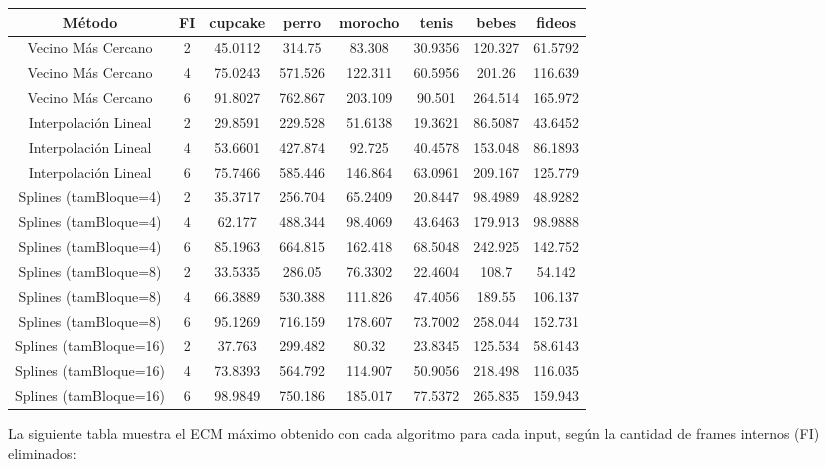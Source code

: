 \bigskip
{}
\begin{tabular}{| c | c | c | c | c | c | c | c |} 
\hline
\textbf{Método} & \textbf{FI} & \textbf{cupcake} & \textbf{perro} & \textbf{morocho} & \textbf{tenis} & \textbf{bebes} & \textbf{fideos} \\ 
\hline
Vecino Más Cercano & 2 & 45.0112 & 314.75 & 83.308 & 30.9356 & 120.327 & 61.5792 \\ 
\hline
Vecino Más Cercano & 4 & 75.0243 & 571.526 & 122.311 & 60.5956 & 201.26 & 116.639 \\ 
\hline
Vecino Más Cercano & 6 & 91.8027 & 762.867 & 203.109 & 90.501 & 264.514 & 165.972 \\ 
\hline
Interpolación Lineal & 2 & 29.8591 & 229.528 & 51.6138 & 19.3621 & 86.5087 & 43.6452 \\ 
\hline
Interpolación Lineal & 4 & 53.6601 & 427.874 & 92.725 & 40.4578 & 153.048 & 86.1893 \\ 
\hline
Interpolación Lineal & 6 & 75.7466 & 585.446 & 146.864 & 63.0961 & 209.167 & 125.779 \\ 
\hline
Splines (tamBloque=4) & 2 & 35.3717 & 256.704 & 65.2409 & 20.8447 & 98.4989 & 48.9282 \\ 
\hline
Splines (tamBloque=4) & 4 & 62.177 & 488.344 & 98.4069 & 43.6463 & 179.913 & 98.9888 \\ 
\hline
Splines (tamBloque=4) & 6 & 85.1963 & 664.815 & 162.418 & 68.5048 & 242.925 & 142.752 \\ 
\hline
Splines (tamBloque=8) & 2 & 33.5335 & 286.05 & 76.3302 & 22.4604 & 108.7 & 54.142 \\ 
\hline
Splines (tamBloque=8) & 4 & 66.3889 & 530.388 & 111.826 & 47.4056 & 189.55 & 106.137 \\ 
\hline
Splines (tamBloque=8) & 6 & 95.1269 & 716.159 & 178.607 & 73.7002 & 258.044 & 152.731 \\ 
\hline
Splines (tamBloque=16) & 2 & 37.763 & 299.482 & 80.32 & 23.8345 & 125.534 & 58.6143 \\ 
\hline
Splines (tamBloque=16) & 4 & 73.8393 & 564.792 & 114.907 & 50.9056 & 218.498 & 116.035 \\
\hline
Splines (tamBloque=16) & 6 & 98.9849 & 750.186 & 185.017 & 77.5372 & 265.835 & 159.943 \\
\hline
\end{tabular}

\bigskip

La siguiente tabla muestra el ECM máximo obtenido con cada algoritmo para cada input, según la cantidad de frames internos (FI) eliminados:

